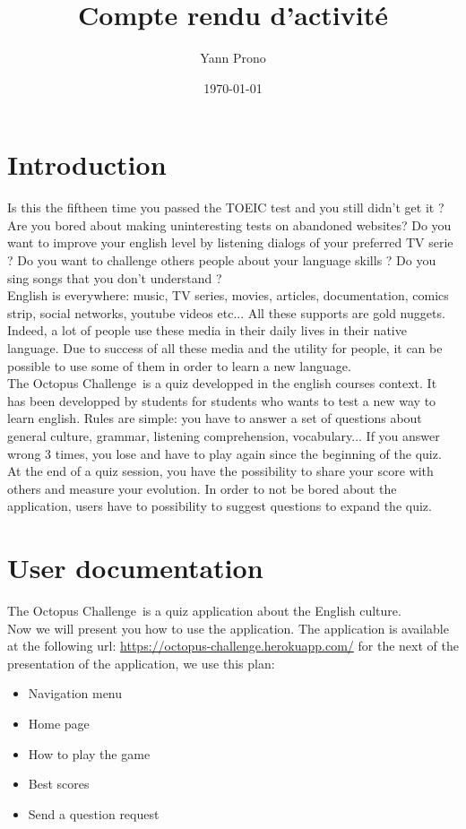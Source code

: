 \documentclass[a4paper,11pt, oneside]{book}
\title{Compte rendu d'activité}
\author{Yann Prono}
\date{\today}
\def\appName{The Octopus Challenge}
\begin{document}
	\begin{titlepage}
		
	\end{titlepage}


	\newpage

	\newpage\null\thispagestyle{empty}\newpage
	\setcounter{page}{1}
	\tableofcontents

	\chapter{Introduction}

Is this the fiftheen time you passed the TOEIC test and you still didn't get it ?
Are you bored about making uninteresting tests on abandoned websites?
Do you want to improve your english level by listening dialogs of your preferred TV serie ?
Do you want to challenge others people about your language skills ?
Do you sing songs that you don't understand ?\\

\noindent English is everywhere: music, TV series, movies, articles, documentation, comics strip, social networks, youtube videos etc...
All these supports are gold nuggets. Indeed, a lot of people use these media in their daily lives in their native language.
Due to success of all these media and the utility for people, it can be possible to use some of them in order to learn a new language.\\

\noindent \appName \ is a quiz developped in the english courses context. It has been developped by students for students who wants to test a new way to learn english.
Rules are simple: you have to answer a set of questions about general culture, grammar, listening comprehension, vocabulary... If you answer wrong 3 times, you lose and have to play again since the beginning of the quiz.
At the end of a quiz session, you have the possibility to share your score with others and measure your evolution.
In order to not be bored about the application, users have to possibility to suggest questions to expand the quiz.

\setcounter{page}{1}
	\clearpage


\chapter{User documentation}
	\appName \ is a quiz application about the English culture.\\
	Now we will present you how to use the application. The application is available at the following url:
	\href{https://octopus-challenge.herokuapp.com/}{https://octopus-challenge.herokuapp.com/}
	for the next of the presentation of the application, we use this plan:
	\begin{itemize}
		\item Navigation menu
		\item Home page
		\item How to play the game
		\item Best scores
		\item Send a question request\\
	\end{itemize}
\end{document}
